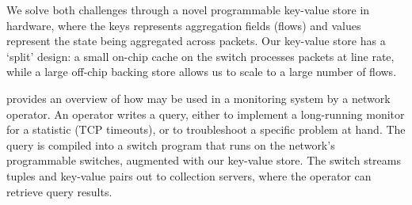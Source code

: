 We solve both challenges through a novel programmable key-value store in
hardware, where the keys represents aggregation fields (\eg flows) and values
represent the state being aggregated across packets. Our key-value store has a
`split' design: a small on-chip cache on the switch processes packets at line
rate, while a large off-chip backing store allows us to scale to a large number
of flows.

 provides an overview of how \TheSystem may be used in a
monitoring system by a network operator. An operator writes a \TheSystem query,
either to implement a long-running monitor for a statistic (\eg TCP timeouts),
or to troubleshoot a specific problem at hand. The query is compiled into a
switch program that runs on the network's programmable switches, augmented with
our key-value store. The switch streams tuples and key-value pairs out to
collection servers, where the operator can retrieve query results.
